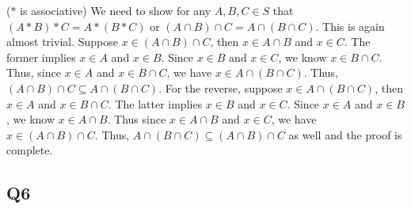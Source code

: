 \documentclass[12pt]{article}
\numberwithin{theorem}{section}
\numberwithin{equation}{section}
\numberwithin{remark}{section}
\numberwithin{definition}{section}
\numberwithin{theorem}{section}
\numberwithin{lemma}{section}
\numberwithin{example}{section}
\begin{document}
\vspace{\baselineskip}

\noindent ($*$ is associative) We need to show for any $A, B, C \in S$ that $(A * B) * C = A * (B * C)$ or $(A \cap B) \cap C = A \cap (B \cap C)$. This is again almost trivial. Suppose $x \in (A \cap B) \cap C$, then $x \in A \cap B$ and $x \in C$. The former implies $x \in A$ and $x \in B$. Since $x \in B$ and $x \in C$, we know $x \in B \cap C$. Thus, since $x \in A$ and $x \in B \cap C$, we have $x \in A \cap (B \cap C)$. Thus, $(A \cap B) \cap C \subseteq A \cap (B \cap C)$. For the reverse, suppose $x \in A \cap (B \cap C)$, then $x \in A$ and $x \in B \cap C$. The latter implies $x \in B$ and $x \in C$. Since $x \in A$ and $x \in B$, we know $x \in A \cap B$. Thus since $x \in A \cap B$ and $x \in C$, we have $x \in (A \cap B) \cap C$. Thus, $A \cap (B \cap C) \subseteq (A \cap B) \cap C$ as well and the proof is complete. 



\subsection{Q6}
\end{document}

